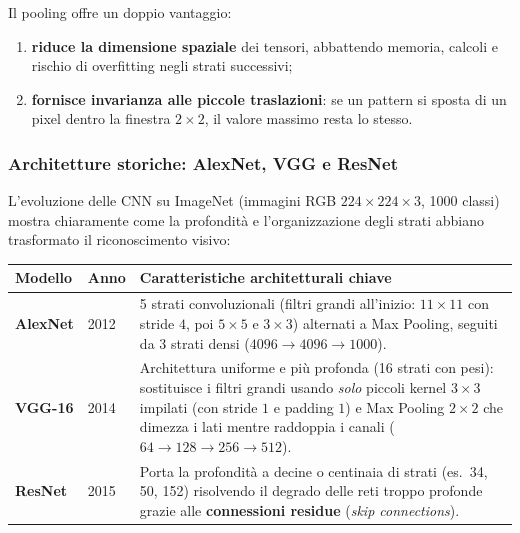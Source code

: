 \documentclass[12pt]{extarticle}
\begin{document}
\noindent Il pooling offre un doppio vantaggio:
\begin{enumerate}
    \item \textbf{riduce la dimensione spaziale} dei tensori, abbattendo memoria, calcoli e rischio di overfitting negli strati successivi;
    \item \textbf{fornisce invarianza alle piccole traslazioni}: se un pattern si sposta di un pixel dentro la finestra $2\times 2$, il valore massimo resta lo stesso.
\end{enumerate}

\subsubsection{Architetture storiche: AlexNet, VGG e ResNet}

\noindent L'evoluzione delle CNN su ImageNet (immagini RGB $224\times 224\times 3$, 1000 classi) mostra chiaramente come la profondità e l'organizzazione degli strati abbiano trasformato il riconoscimento visivo:

\begin{center}
\small
\renewcommand{\arraystretch}{1.25}
\begin{tabular}{L{2.3cm}L{1.8cm}L{9.5cm}}
    \toprule
    \textbf{Modello} & \textbf{Anno} & \textbf{Caratteristiche architetturali chiave} \\
    \midrule
    \textbf{AlexNet} & 2012 & 5 strati convoluzionali (filtri grandi all'inizio: $11\times 11$ con stride $4$, poi $5\times 5$ e $3\times 3$) alternati a Max Pooling, seguiti da 3 strati densi ($4096 \to 4096 \to 1000$). \\
    \textbf{VGG-16} & 2014 & Architettura uniforme e più profonda (16 strati con pesi): sostituisce i filtri grandi usando \emph{solo} piccoli kernel $3\times 3$ impilati (con stride $1$ e padding $1$) e Max Pooling $2\times 2$ che dimezza i lati mentre raddoppia i canali ($64 \to 128 \to 256 \to 512$). \\
    \textbf{ResNet} & 2015 & Porta la profondità a decine o centinaia di strati (es.\ 34, 50, 152) risolvendo il degrado delle reti troppo profonde grazie alle \textbf{connessioni residue} (\emph{skip connections}). \\
    \bottomrule
\end{tabular}
\end{center}
\end{document}
